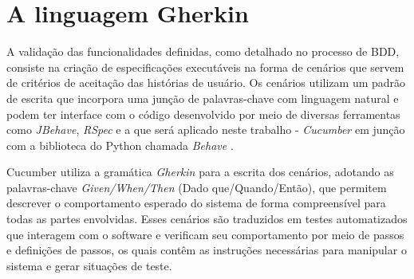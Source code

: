 



\section{\textbf{A linguagem Gherkin}}
A validação das funcionalidades definidas, como detalhado no processo de BDD, consiste na criação de especificações executáveis na forma de cenários que servem de 
critérios de aceitação das histórias de usuário. Os cenários utilizam um padrão de escrita que incorpora uma junção de palavras-chave com linguagem natural e podem 
ter interface com o código desenvolvido por meio de diversas ferramentas como \textit{JBehave}, \textit{RSpec} \cite{cucumberHistory} e a que será aplicado neste trabalho - 
\textit{Cucumber} \cite{cucumberDocs}  em junção com a biblioteca do Python chamada \textit{Behave} \cite{behaveDocs}.

Cucumber utiliza a gramática \textit{Gherkin} para a escrita dos cenários, adotando as palavras-chave \textit{Given/When/Then} (Dado que/Quando/Então), que permitem descrever o 
comportamento esperado do sistema de forma compreensível para todas as partes envolvidas. Esses cenários são traduzidos em testes automatizados que interagem com 
o software e verificam seu comportamento por meio de passos e definições de passos, os quais contêm as instruções necessárias para manipular o sistema e gerar 
situações de teste.


